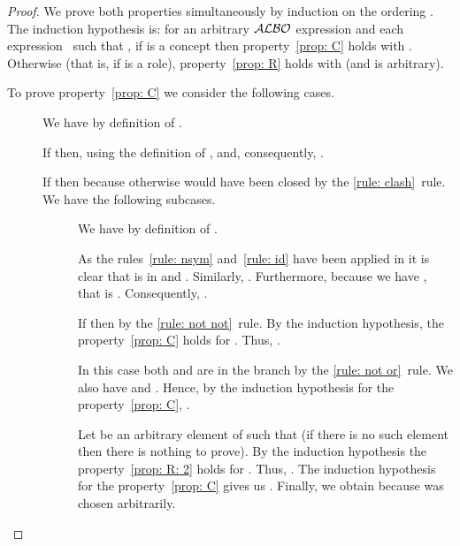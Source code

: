 \documentclass[leqno
,pdflatex
,prodmode
,acmtocl
]{acmsmall}
\newcommand{\mathcmd}[1]{\ensuremath{#1}\xspace}
\newcommand{\dlfont}{\mathcal}
\newcommand{\dl}[1]{\mathcmd{\dlfont{#1}}}
\newcommand{\ALBOid}{\dl{ALBO\smash[t]{\mbox{}}}}
\begin{document}
\begin{proof}
We prove both properties simultaneously by induction on the 
ordering .
The induction hypothesis is:
for an arbitrary \ALBOid expression 
and each expression~ such that ,
if  is a concept then property~\eqref{prop: C} holds with .
Otherwise (that is, if  is a role), property~\eqref{prop: R} holds with  (and  is arbitrary).

To prove property~\eqref{prop: C} we consider the following cases.
\begin{description}
 \item[] We have  by definition of .
 \item[] If  then, using the definition of ,
       and,
      consequently, .
 \item[] If  then  because
    otherwise  would have been closed by the \eqref{rule: clash}~rule.
    We have the following subcases.
    \begin{description}
     \item[] We have  by definition of .
     \item[] As the rules~\eqref{rule: nsym} and~\eqref{rule: id} have been applied in 
                             it is clear
                             that  is in  and .
                             Similarly, .
                             Furthermore, because  we have ,
                             that is . 
                             Consequently, .
     \item[] 
        If  then  
        by the \eqref{rule: not not}~rule.
        By the induction hypothesis, the property~\eqref{prop: C} holds for .
        Thus, .
     \item[] In this case both  and  are in the branch 
        by the \eqref{rule: not or}~rule. We also have  and 
        .
        Hence, by the induction hypothesis for the property~\eqref{prop: C}, 
        .
     \item[] Let  be an arbitrary element of  such that
         (if there is no such element then there is nothing to prove).
        By the induction hypothesis the property~\eqref{prop: R: 2} holds
        for . Thus, . The induction hypothesis
        for the property~\eqref{prop: C} gives us . Finally,
        we obtain  because  was chosen arbitrarily.
    \end{description}


\end{description}
\end{proof}
\end{document}

